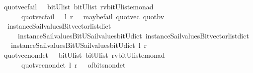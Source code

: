 \begin{isabellebody}
\isanewline
{}\isamarkupfalse%
\ quot{\isacharunderscore}vec{\isacharunderscore}fail\ \ {\isacharcolon}{\isacharcolon}\ {\isachardoublequoteopen}{\isacharparenleft}bitU{\isacharparenright}list\ {\isasymRightarrow}{\isacharparenleft}bitU{\isacharparenright}list\ {\isasymRightarrow}{\isacharparenleft}{\isacharprime}rv{\isacharcomma}{\isacharparenleft}{\isacharparenleft}bitU{\isacharparenright}list{\isacharparenright}{\isacharcomma}{\isacharprime}e{\isacharparenright}monad\ {\isachardoublequoteclose}\ \ \ \isanewline
\ \ \ \ \ {\isachardoublequoteopen}\ quot{\isacharunderscore}vec{\isacharunderscore}fail\ \ \ l\ r\ {\isacharequal}\ {\isacharparenleft}\ maybe{\isacharunderscore}fail\ {\isacharparenleft}{\isacharprime}{\isacharprime}quot{\isacharunderscore}vec{\isacharprime}{\isacharprime}{\isacharparenright}\ {\isacharparenleft}quot{\isacharunderscore}bv\ \isanewline
\ \ {\isacharparenleft}instance{\isacharunderscore}Sail{}{\isacharunderscore}values{\isacharunderscore}Bitvector{\isacharunderscore}list{\isacharunderscore}dict\isanewline
\ \ \ \ \ instance{\isacharunderscore}Sail{}{\isacharunderscore}values{\isacharunderscore}BitU{\isacharunderscore}Sail{}{\isacharunderscore}values{\isacharunderscore}bitU{\isacharunderscore}dict{\isacharparenright}\ {\isacharparenleft}instance{\isacharunderscore}Sail{}{\isacharunderscore}values{\isacharunderscore}Bitvector{\isacharunderscore}list{\isacharunderscore}dict\isanewline
\ \ \ instance{\isacharunderscore}Sail{}{\isacharunderscore}values{\isacharunderscore}BitU{\isacharunderscore}Sail{}{\isacharunderscore}values{\isacharunderscore}bitU{\isacharunderscore}dict{\isacharparenright}\ l\ r{\isacharparenright}{\isacharparenright}{\isachardoublequoteclose}\isanewline
\isanewline
{}\isamarkupfalse%
\ quot{\isacharunderscore}vec{\isacharunderscore}nondet\ \ {\isacharcolon}{\isacharcolon}\ {\isachardoublequoteopen}{\isacharparenleft}bitU{\isacharparenright}list\ {\isasymRightarrow}{\isacharparenleft}bitU{\isacharparenright}list\ {\isasymRightarrow}{\isacharparenleft}{\isacharprime}rv{\isacharcomma}{\isacharparenleft}{\isacharparenleft}bitU{\isacharparenright}list{\isacharparenright}{\isacharcomma}{\isacharprime}e{\isacharparenright}monad\ {\isachardoublequoteclose}\ \ \ \isanewline
\ \ \ \ \ {\isachardoublequoteopen}\ quot{\isacharunderscore}vec{\isacharunderscore}nondet\ l\ r\ {\isacharequal}\ {\isacharparenleft}\ of{\isacharunderscore}bits{\isacharunderscore}nondet\ \isanewline

\end{isabellebody}
